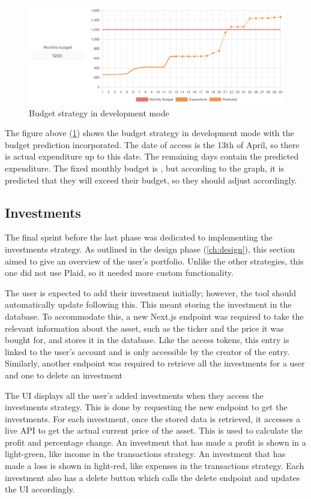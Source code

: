 \begin{figure}[H]
	\centering
	\includegraphics[width=\textwidth]{images/budget_strategy.png}
	\caption{Budget strategy in development mode}
	\label{fig:BudgetStrategy}
\end{figure}

The figure above (\ref{fig:BudgetStrategy}) shows the budget strategy in development mode with the budget prediction incorporated. The date of access is the 13th of April, so there is actual expenditure up to this date. The remaining days contain the predicted expenditure. The fixed monthly budget is , but according to the graph, it is predicted that they will exceed their budget, so they should adjust accordingly.

\subsection{Investments}
The final sprint before the last phase was dedicated to implementing the investments strategy. As outlined in the design phase (\ref{ch:design}), this section aimed to give an overview of the user's portfolio. Unlike the other strategies, this one did not use Plaid, so it needed more custom functionality. 

The user is expected to add their investment initially; however, the tool should automatically update following this. This meant storing the investment in the database. To accommodate this, a new Next.js endpoint was required to take the relevant information about the asset, such as the ticker and the price it was bought for, and stores it in the database. Like the access tokens, this entry is linked to the user's account and is only accessible by the creator of the entry. Similarly, another endpoint was required to retrieve all the investments for a user and one to delete an investment

The UI displays all the user's added investments when they access the investments strategy. This is done by requesting the new endpoint to get the investments. For each investment, once the stored data is retrieved, it accesses a live API to get the actual current price of the asset. This is used to calculate the profit and percentage change. An investment that has made a profit is shown in a light-green, like income in the transactions strategy. An investment that has made a loss is shown in light-red, like expenses in the transactions strategy. Each investment also has a delete button which calls the delete endpoint and updates the UI accordingly.

